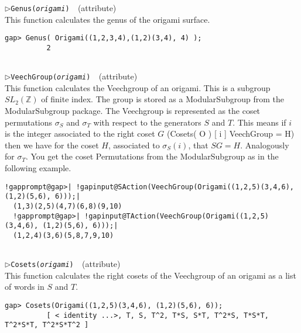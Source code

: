 \documentclass[a4paper,11pt]{report}
\begin{document}
{{{\begin{Verbatim}[commandchars=!@|,fontsize=\small,frame=single,label=Example]
\end{Verbatim}
 \noindent\textcolor{FuncColor}{$\triangleright$\enspace\texttt{Genus({\mdseries\slshape origami})
\label{Genus}
}\hfill{\scriptsize (attribute)}}\\


 This function calculates the genus of the origami surface. 
\begin{Verbatim}[commandchars=!@|,fontsize=\small,frame=single,label=Example]
          gap> Genus( Origami((1,2,3,4),(1,2)(3,4), 4) );
          2
          
\end{Verbatim}
 \noindent\textcolor{FuncColor}{$\triangleright$\enspace\texttt{VeechGroup({\mdseries\slshape origami})
\label{VeechGroup}
}\hfill{\scriptsize (attribute)}}\\


 This function calculates the Veechgroup of an origami. This is a subgroup $SL_2(\mathbb{Z})$ of finite index. The group is stored as a ModularSubgroup from the \textsf{ModularSubgroup} package. The Veechgroup is represented as the coset permutations $\sigma_S$ and $\sigma_T$ with respect to the generators $S$ and $T$. This means if $i$ is the integer associated to the right coset $G$ (Cosets( O ) [ i ] VeechGroup = H) then we have for the coset $H$, associated to $\sigma_S(i)$, that $SG = H$. Analogously for $\sigma_T$. You get the coset Permutations from the ModularSubgroup as in the following
example. 
\begin{Verbatim}[commandchars=!@|,fontsize=\small,frame=single,label=Example]
  !gapprompt@gap>| !gapinput@SAction(VeechGroup(Origami((1,2,5)(3,4,6), (1,2)(5,6), 6)));|
  (1,3)(2,5)(4,7)(6,8)(9,10)
  !gapprompt@gap>| !gapinput@TAction(VeechGroup(Origami((1,2,5)(3,4,6), (1,2)(5,6), 6)));|
  (1,2,4)(3,6)(5,8,7,9,10)
          
\end{Verbatim}
 \noindent\textcolor{FuncColor}{$\triangleright$\enspace\texttt{Cosets({\mdseries\slshape origami})
\label{Cosets}
}\hfill{\scriptsize (attribute)}}\\


 This function calculates the right cosets of the Veechgroup of an origami as a
list of words in $S$ and $T$. 
\begin{Verbatim}[commandchars=!@|,fontsize=\small,frame=single,label=Example]
          gap> Cosets(Origami((1,2,5)(3,4,6), (1,2)(5,6), 6));
          [ < identity ...>, T, S, T^2, T*S, S*T, T^2*S, T*S*T, T^2*S*T, T^2*S*T^2 ]
          

\end{Verbatim}}}}
\end{document}
